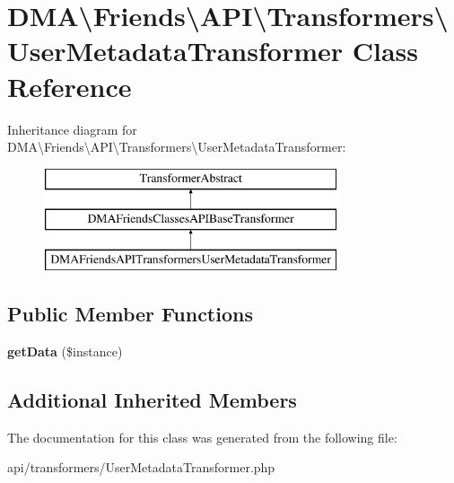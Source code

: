 \hypertarget{classDMA_1_1Friends_1_1API_1_1Transformers_1_1UserMetadataTransformer}{}\section{D\+M\+A\textbackslash{}Friends\textbackslash{}A\+P\+I\textbackslash{}Transformers\textbackslash{}User\+Metadata\+Transformer Class Reference}
\label{classDMA_1_1Friends_1_1API_1_1Transformers_1_1UserMetadataTransformer}
Inheritance diagram for D\+M\+A\textbackslash{}Friends\textbackslash{}A\+P\+I\textbackslash{}Transformers\textbackslash{}User\+Metadata\+Transformer\+:\begin{figure}[H]
\begin{center}
\leavevmode
\includegraphics[height=3.000000cm]{d6/d2d/classDMA_1_1Friends_1_1API_1_1Transformers_1_1UserMetadataTransformer}
\end{center}
\end{figure}
\subsection*{Public Member Functions}
\begin{DoxyCompactItemize}
\item 
\hypertarget{classDMA_1_1Friends_1_1API_1_1Transformers_1_1UserMetadataTransformer_ada25608c2463185d6bb056e6d289a16a}{}{\bfseries get\+Data} (\$instance)\label{classDMA_1_1Friends_1_1API_1_1Transformers_1_1UserMetadataTransformer_ada25608c2463185d6bb056e6d289a16a}

\end{DoxyCompactItemize}
\subsection*{Additional Inherited Members}


The documentation for this class was generated from the following file\+:\begin{DoxyCompactItemize}
\item 
api/transformers/User\+Metadata\+Transformer.\+php\end{DoxyCompactItemize}
